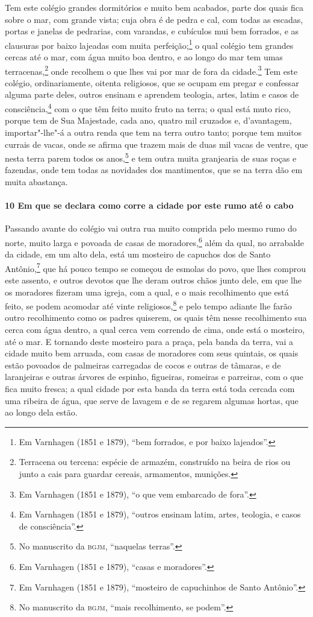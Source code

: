 \begin{linenumbers}
Tem este colégio grandes dormitórios e muito bem acabados, parte dos quais fica sobre o
mar, com grande vista; cuja obra é de pedra e cal, com todas as escadas, portas e janelas
de pedrarias, com varandas, e cubículos mui bem forrados, e as clausuras por baixo
lajeadas com muita perfeição;\footnote{ Em Varnhagen (1851 e 1879), ``bem forrados, e por
baixo lajeados''.} o qual colégio tem grandes cercas até o mar, com água muito boa dentro,
e ao longo do mar tem umas terracenas,\footnote{ Terracena ou tercena: espécie de armazém,
construído na beira de rios ou junto a cais para guardar cereais, armamentos, munições.}
onde recolhem o que lhes vai por mar de fora da cidade.\footnote{ Em Varnhagen (1851 e
1879), ``o que vem embarcado de fora''.} Tem este colégio, ordinariamente, oitenta
religiosos, que se ocupam em pregar e confessar alguma parte deles, outros ensinam e
aprendem teologia, artes, latim e casos de consciência,\footnote{ Em Varnhagen (1851 e
1879), ``outros ensinam latim, artes, teologia, e casos de consciência''.} com o que têm
feito muito fruto na terra; o qual está muto rico, porque tem de Sua Majestade, cada ano,
quatro mil cruzados e, d'avantagem, importar"-lhe"-á a outra renda que tem na terra outro
tanto; porque tem muitos currais de vacas, onde se afirma que trazem mais de duas mil
vacas de ventre, que nesta terra parem todos os anos,\footnote{ No manuscrito da
\textsc{bgjm}, ``naquelas terras''.} e tem outra muita granjearia de suas roças e
fazendas, onde tem todas as novidades dos mantimentos, que se na terra dão em muita
abastança.

\paragraph{10 Em que se declara como corre a cidade por este rumo até o cabo} \quad
Passando avante do colégio vai outra rua muito comprida pelo mesmo rumo do norte, muito
larga e povoada de casas de moradores,\footnote{ Em Varnhagen (1851 e 1879), ``casas e
moradores''.} além da qual, no arrabalde da cidade, em um alto dela, está um mosteiro de
capuchos dos de Santo Antônio,\footnote{ Em Varnhagen (1851 e 1879), ``mosteiro de
capuchinhos de Santo Antônio''.} que há pouco tempo se começou de esmolas do povo, que
lhes comprou este assento, e outros devotos que lhe deram outros chãos junto dele, em que
lhe os moradores fizeram uma igreja, com a qual, e o mais recolhimento que está feito, se
podem acomodar até vinte religiosos,\footnote{ No manuscrito da \textsc{bgjm}, ``mais
recolhimento, se podem''.} e pelo tempo adiante lhe farão outro recolhimento como os
padres quiserem, os quais têm nesse recolhimento sua cerca com água dentro, a qual cerca
vem correndo de cima, onde está o mosteiro, até o mar. E tornando deste mosteiro para a
praça, pela banda da terra, vai a cidade muito bem arruada, com casas de moradores com
seus quintais, os quais estão povoados de palmeiras carregadas de cocos e outras de
tâmaras, e de laranjeiras e outras árvores de espinho, figueiras, romeiras e parreiras,
com o que fica muito fresca; a qual cidade por esta banda da terra está toda cercada com
uma ribeira de água, que serve de lavagem e de se regarem algumas hortas, que ao longo
dela estão.


\end{linenumbers}
